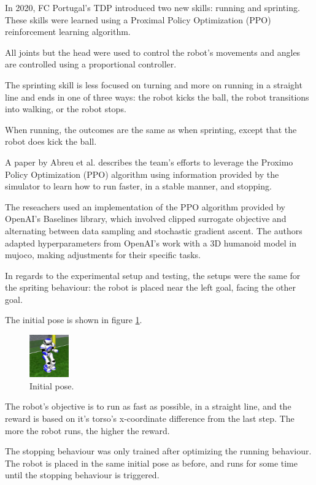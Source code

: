 \documentclass[conference]{IEEEtran}
\begin{document}
In 2020, FC Portugal's TDP \cite{lau2020fc} introduced two new skills: running and sprinting. These skills were learned using
a Proximal Policy Optimization (PPO) reinforcement learning algorithm.

All joints but the head were used to control the robot's movements and angles are controlled using a proportional controller.

The sprinting skill is less focused on turning and more on running in a straight line and ends in one of three ways:
the robot kicks the ball, the robot transitions into walking, or the robot stops.

When running, the outcomes are the same as when sprinting, except that the robot does kick the ball.

A paper by Abreu et al. \cite{10.1007/978-3-030-35699-6_1} describes the team's efforts to leverage the Proximo Policy Optimization (PPO)
algorithm using information provided by the simulator to learn how to run faster, in a stable manner, and stopping.

The reseachers used an implementation of the PPO algorithm provided by OpenAI's Baselines library, which involved
clipped surrogate objective and alternating between data sampling and stochastic gradient ascent. The authors adapted hyperparameters from OpenAI's work with a
3D humanoid model in mujoco, making adjustments for their specific tasks.

In regards to the experimental setup and testing, the setups were the same for the spriting behaviour: the robot is placed near the left goal, facing the other
goal.

The initial pose is shown in figure \ref{fig:initial_pose}.

\begin{figure}[htbp]
    \centerline{\includegraphics[width=0.15\textwidth]{images/initial_pose.png}}
    \caption{Initial pose.}
    \label{fig:initial_pose}
\end{figure}

The robot's objective is to run as fast as possible, in a straight line, and the reward is based on it's torso's x-coordinate difference
from the last step. The more the robot runs, the higher the reward.

The stopping behaviour was only trained after optimizing the running behaviour.
The robot is placed in the same initial pose as before, and runs for some time until the stopping behaviour is triggered.
\end{document}
